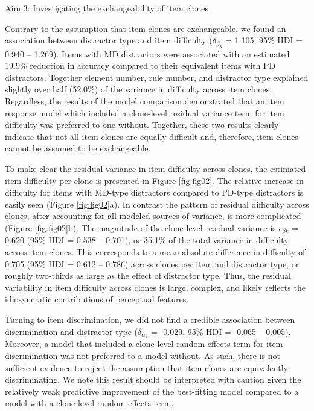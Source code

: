 \documentclass[a4paper,man,natbib,noextraspace]{apa6}
\makeatletter
\renewcommand{\subsubsection}{\@startsection{subsubsection}{3}
  {\z@}%
  {\b@level@two@skip}{\e@level@two@skip}%
  {\normalfont\normalsize\bfseries}}
\makeatother
\begin{document}
\subsubsection{Aim 3: Investigating the exchangeability of item clones}

Contrary to the assumption that item clones are exchangeable, we found an association between distractor type and item difficulty ($\delta_{\beta_3}$ = 1.105, 95\% HDI = 0.940 -- 1.269). Items with MD distractors were associated with an estimated 19.9\% reduction in accuracy compared to their equivalent items with PD distractors. Together element number, rule number, and distractor type explained slightly over half (52.0\%) of the variance in difficulty across item clones. Regardless, the results of the model comparison demonstrated that an item response model which included a clone-level residual variance term for item difficulty was preferred to one without. Together, these two results clearly indicate that not all item clones are equally difficult and, therefore, item clones cannot be assumed to be exchangeable. 

To make clear the residual variance in item difficulty across clones, the estimated item difficulty per clone is presented in Figure \ref{fig:fig02}. The relative increase in difficulty for items with MD-type distractors compared to PD-type distractors is easily seen (Figure \ref{fig:fig02}a). In contrast the pattern of residual difficulty across clones, after accounting for all modeled sources of variance, is more complicated (Figure \ref{fig:fig02}b). The magnitude of the clone-level residual variance is $\epsilon_{\beta k}$ = 0.620 (95\% HDI = 0.538 -- 0.701), or 35.1\% of the total variance in difficulty across item clones. This corresponds to a mean absolute difference in difficulty of 0.705 (95\% HDI = 0.612 -- 0.786) across clones per item and distractor type, or roughly two-thirds as large as the effect of distractor type. Thus, the residual variability in item difficulty across clones is large, complex, and likely reflects the idiosyncratic contributions of perceptual features. 

Turning to item discrimination, we did not find a credible association between discrimination and distractor type ($\delta_{\alpha_3}$ = -0.029, 95\% HDI = -0.065 -- 0.005). Moreover, a model that included a clone-level random effects term for item discrimination was not preferred to a model without. As such, there is not sufficient evidence to reject the assumption that item clones are equivalently discriminating. We note this result should be interpreted with caution given the relatively weak predictive improvement of the best-fitting model compared to a model with a clone-level random effects term.
\end{document}

